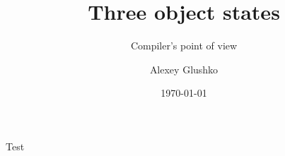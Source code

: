 \documentclass[aspectratio=169]{beamer}
\title{Three object states}
\subtitle{Compiler's point of view}
\author{Alexey Glushko}
\date{\today}
\begin{document}
    \begin{frame}{Test}
    \end{frame}
\end{document}
